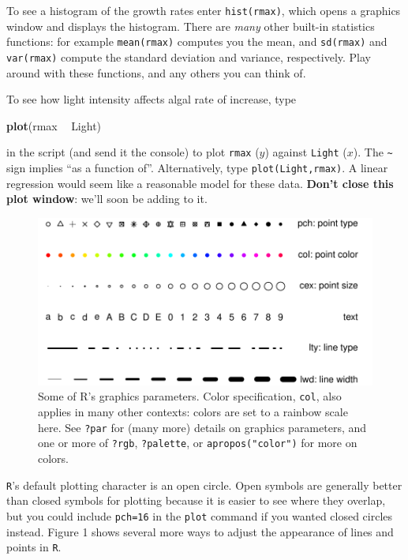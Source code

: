 \documentclass[11pt,]{article}
\newenvironment{Shaded}{\begin{snugshade}}{\end{snugshade}}
\newcommand{\KeywordTok}[1]{\textcolor[rgb]{0.13,0.29,0.53}{\textbf{#1}}}
\newcommand{\NormalTok}[1]{#1}
\newcommand{\OperatorTok}[1]{\textcolor[rgb]{0.81,0.36,0.00}{\textbf{#1}}}
\newcommand{\StringTok}[1]{\textcolor[rgb]{0.31,0.60,0.02}{#1}}
\begin{document}
To see a histogram of the growth rates enter \texttt{hist(rmax)}, which opens a graphics window and displays the histogram. There are \emph{many} other built-in statistics functions: for example \texttt{mean(rmax)} computes you the mean, and \texttt{sd(rmax)} and \texttt{var(rmax)} compute the standard deviation and variance, respectively. Play around with these functions, and any others you can think of.

To see how light intensity affects algal rate of increase, type

\begin{Shaded}
\begin{Highlighting}[]
\KeywordTok{plot}\NormalTok{(rmax }\OperatorTok{~}\StringTok{ }\NormalTok{Light)}
\end{Highlighting}
\end{Shaded}

in the script (and send it the console) to plot \texttt{rmax} (\(y\)) against \texttt{Light} (\(x\)). The \texttt{\textasciitilde{}} sign implies ``as a function of''. Alternatively, type \texttt{plot(Light,rmax)}. A linear regression would seem like a reasonable model for these data. \textbf{Don't close this plot window}: we'll soon be adding to it.

\begin{figure}
\centering
\includegraphics{Lab_1_modified_files/figure-latex/unnamed-chunk-17-1.pdf}
\caption{\label{fig:unnamed-chunk-17}Some of R's graphics parameters. Color specification, \texttt{col}, also applies in many other contexts: colors are set to a rainbow scale here. See \texttt{?par} for (many more) details on graphics parameters, and one or more of \texttt{?rgb}, \texttt{?palette}, or \texttt{apropos("color")} for more on colors.}
\end{figure}

\texttt{R}'s default plotting character is an open circle. Open symbols are generally better than closed symbols for plotting because it is easier to see where they overlap, but you could include \texttt{pch=16} in the \texttt{plot} command if you wanted closed circles instead. Figure 1 shows several more ways to adjust the appearance of lines and points in \texttt{R}.
\end{document}
